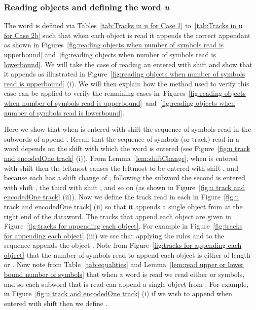 \documentclass[11pt]{article} \usepackage{amsfonts,amsmath,amssymb,amsthm}
\begin{document}
\subsubsection{Reading objects and defining the word \emph{u}}\label{sec:Reading objects and  subwords}
The word  is defined via Tables~\ref{tab:Tracks in u for Case 1} to~\ref{tab:Tracks in u for Case 2b} such that when each object is read it appends the correct appendant as shown in Figures~\ref{fig:reading objects when number of symbols read is upperbound} and~\ref{fig:reading objects when number of symbols read is lowerbound}. 
We will take the case of reading an  entered with shift  and show that it appends  as illustrated in Figure~\ref{fig:reading objects when number of symbols read is upperbound} (i). We will then explain how the method used to verify this case can be applied to verify the remaining cases in~Figures~\ref{fig:reading objects when number of symbols read is upperbound}~and~\ref{fig:reading objects when number of symbols read is lowerbound}.

Here we show that when  is entered with shift  the sequence of symbols read in the  subwords of  append . 
Recall that the sequence of symbols (or track) read in a word depends on the shift with which the word is entered (see Figure~\ref{fig:u track and encodedOne track} (i)). 
From Lemma~\ref{lem:shiftChange}, when  is entered with shift  then the leftmost  causes the leftmost  to be entered with shift , and because each  has a shift change of , following the  subword the second  is entered with shift , the third  with shift , and so on (as shown in Figure~\ref{fig:u track and encodedOne track} (ii)). 
Now we define the track read in each  in Figure~\ref{fig:u track and encodedOne track} (ii) so that it appends a single object from  at the right end of the dataword. 
The tracks that append each object are given in Figure~\ref{fig:tracks for appending each object}. For example in Figure~\ref{fig:tracks for appending each object} (iii) we see that applying the rules  and  to the sequence  appends the object .
Note from Figure~\ref{fig:tracks for appending each object} that the number of symbols read to append each object is either of length  or .
Now note from Table~\ref{tab:equalities} and Lemma~\ref{lem:read upper or lower bound number of symbols} that when a  word is read we read either  or  symbols, and so each  subword that is read can append a single object from . For example, in Figure~\ref{fig:u track and encodedOne track} (i) if we wish  to append  when entered with shift  then we define . 
\end{document}
